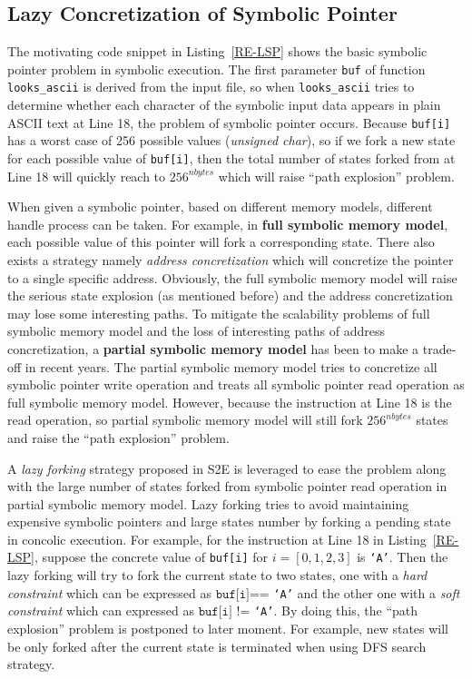 \subsection{Lazy Concretization of Symbolic Pointer}
The motivating code snippet in Listing~\ref{RE-LSP} shows the basic symbolic pointer problem in symbolic execution. 
The first parameter \texttt{buf} of function \texttt{looks\_ascii} is derived from the input file, so when \texttt{looks\_ascii} tries to determine whether each character of the symbolic input data appears in plain ASCII text at Line 18, the problem of symbolic pointer occurs. Because \texttt{buf[i]} has a worst case of 256 possible values (\textit{unsigned char}), so if we fork a new state for each possible value of \texttt{buf[i]}, then the total number of states forked from at Line 18 will quickly reach to $256^{nbytes}$ which will raise ``path explosion'' problem.

When given a symbolic pointer, based on different memory models, different handle process can be taken. For example, in \textbf{full symbolic memory model}, each possible value of this pointer will fork a corresponding state. There also exists a strategy namely \textit{address concretization} which will concretize the pointer to a single specific address. Obviously, the full symbolic memory model will raise the serious state explosion (as mentioned before) and the address concretization may lose some interesting paths. To mitigate the scalability problems of full symbolic memory model and the loss of interesting paths of address concretization, a \textbf{partial symbolic memory model} has been to make a trade-off in recent years. The partial symbolic memory model tries to concretize all symbolic pointer write operation and treats all symbolic pointer read operation as full symbolic memory model. However, because the instruction at Line 18 is the read operation, so partial symbolic memory model will still fork $256^{nbytes}$ states and raise the ``path explosion'' problem.

A \textit{lazy forking} strategy proposed in S2E is leveraged to ease the problem along with the large number of states forked from symbolic pointer read operation in partial symbolic memory model. 
Lazy forking tries to avoid maintaining expensive symbolic pointers and large states number by forking a pending state in concolic execution. 
For example, for the instruction at Line 18 in Listing~\ref{RE-LSP}, suppose the concrete value of \texttt{buf[i]} for $i=[0,1,2,3]$ is \texttt{`A'}. Then the lazy forking will try to fork the current state to two states, one with a \textit{hard constraint} which can be expressed as $\texttt{buf[i]}$== \texttt{`A'} and the other one with a \textit{soft constraint} which can expressed as $\texttt{buf[i]}$ != \texttt{`A'}.
By doing this, the ``path explosion'' problem is postponed to later moment. For example, new states will be only forked after the current state is terminated when using DFS search strategy.

